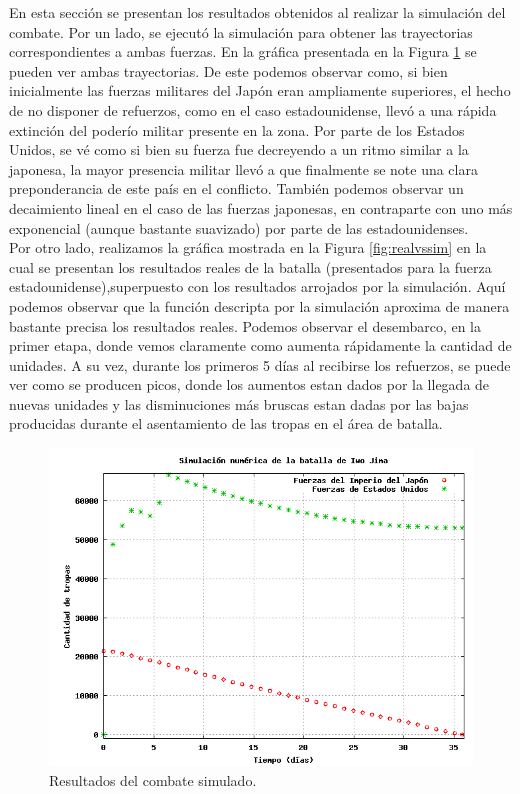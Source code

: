 \documentclass[a4paper,10pt]{article}
\begin{document}
En esta sección se presentan los resultados obtenidos al realizar la simulación del combate. Por un lado, se ejecutó la simulación para obtener las 
trayectorias correspondientes a ambas fuerzas. En la gráfica presentada en la Figura \ref{fig:trays} se pueden ver ambas trayectorias. 
De este podemos observar como, si bien inicialmente las fuerzas militares del Japón eran ampliamente superiores, el hecho de no disponer de 
refuerzos, como en el caso estadounidense, llevó a una rápida extinción del poderío militar presente en la zona. Por parte de los 
Estados Unidos, se vé como si bien su fuerza fue decreyendo a un ritmo similar a la japonesa, la mayor presencia militar llevó a que finalmente
se note una clara preponderancia de este país en el conflicto. También podemos observar un decaimiento lineal en el caso de las fuerzas japonesas,
en contraparte con uno más exponencial (aunque bastante suavizado) por parte de las estadounidenses.\\
Por otro lado, realizamos la gráfica mostrada en la Figura \ref{fig:realvssim} en la cual se presentan los resultados reales de la batalla 
(presentados para la fuerza estadounidense),superpuesto con los resultados arrojados por la simulación. Aquí podemos observar que la función
descripta por la simulación aproxima de manera bastante precisa los resultados reales. Podemos observar el desembarco, en la primer etapa, 
donde vemos claramente como aumenta rápidamente la cantidad de unidades. A su vez, durante los primeros 5 días al recibirse los refuerzos, se
puede ver como se producen picos, donde los aumentos estan dados por la llegada de nuevas unidades y las disminuciones más bruscas estan dadas
por las bajas producidas durante el asentamiento de las tropas en el área de batalla.

\begin{figure}[h]
\begin{center}
\includegraphics[width=12cm]{jap_vs_usa.png}
\caption{\label{fig:trays}Resultados del combate simulado.}
\end{center}
\end{figure}
\end{document}
